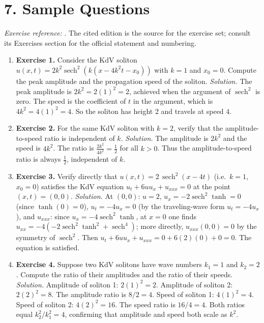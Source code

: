 \section*{7. Sample Questions}
\emph{Exercise reference:} \cite{soliton_ref1}. The cited edition is the source for the exercise set; consult its Exercises section for the official statement and numbering.
\begin{enumerate}[leftmargin=*,itemsep=0.9em]
\item \textbf{Exercise 1.} Consider the KdV soliton $u(x,t) = 2k^2 \operatorname{sech}^2(k(x - 4k^2 t - x_0))$ with $k = 1$ and $x_0 = 0$. Compute the peak amplitude and the propagation speed of the soliton. \emph{Solution.} The peak amplitude is $2k^2 = 2(1)^2 = 2$, achieved when the argument of $\operatorname{sech}^2$ is zero. The speed is the coefficient of $t$ in the argument, which is $4k^2 = 4(1)^2 = 4$. So the soliton has height $2$ and travels at speed $4$.

\item \textbf{Exercise 2.} For the same KdV soliton with $k=2$, verify that the amplitude-to-speed ratio is independent of $k$. \emph{Solution.} The amplitude is $2k^2$ and the speed is $4k^2$. The ratio is $\frac{2k^2}{4k^2} = \frac{1}{2}$ for all $k > 0$. Thus the amplitude-to-speed ratio is always $\frac{1}{2}$, independent of $k$.

\item \textbf{Exercise 3.} Verify directly that $u(x,t) = 2\,\operatorname{sech}^2(x - 4t)$ (i.e.\ $k=1$, $x_0 = 0$) satisfies the KdV equation $u_t + 6uu_x + u_{xxx} = 0$ at the point $(x,t) = (0,0)$. \emph{Solution.} At $(0,0)$: $u = 2$, $u_x = -2\operatorname{sech}^2\tanh = 0$ (since $\tanh(0)=0$), $u_t = -4u_x = 0$ (by the traveling-wave form $u_t = -4u_x$), and $u_{xxx}$: since $u_x = -4\operatorname{sech}^2\tanh$, at $x=0$ one finds $u_{xx} = -4(-2\operatorname{sech}^2\tanh^2 + \operatorname{sech}^4)$; more directly, $u_{xxx}(0,0) = 0$ by the symmetry of $\operatorname{sech}^2$. Then $u_t + 6uu_x + u_{xxx} = 0 + 6(2)(0) + 0 = 0$. The equation is satisfied.

\item \textbf{Exercise 4.} Suppose two KdV solitons have wave numbers $k_1 = 1$ and $k_2 = 2$. Compute the ratio of their amplitudes and the ratio of their speeds. \emph{Solution.} Amplitude of soliton 1: $2(1)^2 = 2$. Amplitude of soliton 2: $2(2)^2 = 8$. The amplitude ratio is $8/2 = 4$. Speed of soliton 1: $4(1)^2 = 4$. Speed of soliton 2: $4(2)^2 = 16$. The speed ratio is $16/4 = 4$. Both ratios equal $k_2^2/k_1^2 = 4$, confirming that amplitude and speed both scale as $k^2$.


\end{enumerate}
